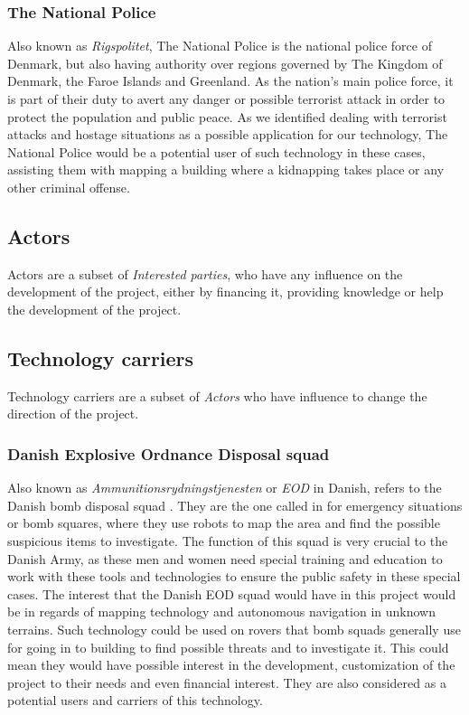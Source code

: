 \subsubsection{The National Police}
Also known as \textit{Rigspolitet}\cite{Police}, The National Police is the national police force of Denmark, but also having authority over regions governed by The Kingdom of Denmark, the Faroe Islands and Greenland. As the nation's main police force, it is part of their duty to avert any danger or possible terrorist attack in order to protect the population and public peace. As we identified dealing with terrorist attacks and hostage situations as a possible application for our technology, The National Police would be a potential user of such technology in these cases, assisting them with mapping a building where a kidnapping takes place or any other criminal offense.

\subsection{Actors}
Actors are a subset of \textit{Interested parties}, who have any influence on the development of the project, either by financing it, providing knowledge or help the development of the project.
	
\subsection{Technology carriers}
Technology carriers are a subset of \textit{Actors} who have influence to change the direction of the project.

\subsubsection{Danish Explosive Ordnance Disposal squad} 
Also known as \textit{Ammunitionsrydningstjenesten} or \textit{EOD} in Danish, refers to the Danish bomb disposal squad \cite{EOD}. They are the one called in for emergency situations or bomb squares, where they use robots to map the area and find the possible suspicious items to investigate. The function of this squad is very crucial to the Danish Army, as these men and women need special training and education to work with these tools and technologies to ensure the public safety in these special cases. The interest that the Danish EOD squad would have in this project would be in regards of mapping technology and autonomous navigation in unknown terrains. Such technology could be used on rovers that bomb squads generally use for going in to building to find possible threats and to investigate it. This could mean they would have possible interest in the development, customization of the project to their needs and even financial interest. They are also considered as a potential users and carriers of this technology.

